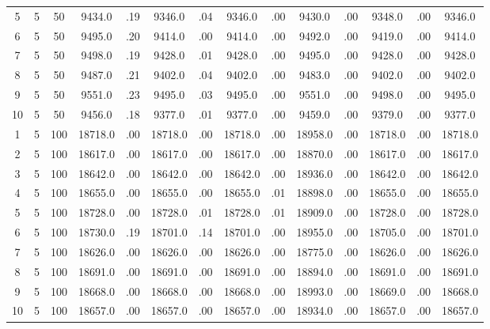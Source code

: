 \documentclass[12pt,a4paper]{article}
\begin{document}
\begin{center}
{\begin{tabular}{|ccc|cc|cc|cc|cc|cc|c|}
5             &   5&  50&   9434.0&  .19&   9346.0&  .04&   9346.0&  .00&   9430.0&  .00&   9348.0&  .00&   9346.0\\[-0.01in]
6             &   5&  50&   9495.0&  .20&   9414.0&  .00&   9414.0&  .00&   9492.0&  .00&   9419.0&  .00&   9414.0\\[-0.01in]
7             &   5&  50&   9498.0&  .19&   9428.0&  .01&   9428.0&  .00&   9495.0&  .00&   9428.0&  .00&   9428.0\\[-0.01in]
8             &   5&  50&   9487.0&  .21&   9402.0&  .04&   9402.0&  .00&   9483.0&  .00&   9402.0&  .00&   9402.0\\[-0.01in]
9             &   5&  50&   9551.0&  .23&   9495.0&  .03&   9495.0&  .00&   9551.0&  .00&   9498.0&  .00&   9495.0\\[-0.01in]
10            &   5&  50&   9456.0&  .18&   9377.0&  .01&   9377.0&  .00&   9459.0&  .00&   9379.0&  .00&   9377.0\\[-0.01in]
1             &   5& 100&  18718.0&  .00&  18718.0&  .00&  18718.0&  .00&  18958.0&  .00&  18718.0&  .00&  18718.0\\[-0.01in]
2             &   5& 100&  18617.0&  .00&  18617.0&  .00&  18617.0&  .00&  18870.0&  .00&  18617.0&  .00&  18617.0\\[-0.01in]
3             &   5& 100&  18642.0&  .00&  18642.0&  .00&  18642.0&  .00&  18936.0&  .00&  18642.0&  .00&  18642.0\\[-0.01in]
4             &   5& 100&  18655.0&  .00&  18655.0&  .00&  18655.0&  .01&  18898.0&  .00&  18655.0&  .00&  18655.0\\[-0.01in]
5             &   5& 100&  18728.0&  .00&  18728.0&  .01&  18728.0&  .01&  18909.0&  .00&  18728.0&  .00&  18728.0\\[-0.01in]
6             &   5& 100&  18730.0&  .19&  18701.0&  .14&  18701.0&  .00&  18955.0&  .00&  18705.0&  .00&  18701.0\\[-0.01in]
7             &   5& 100&  18626.0&  .00&  18626.0&  .00&  18626.0&  .00&  18775.0&  .00&  18626.0&  .00&  18626.0\\[-0.01in]
8             &   5& 100&  18691.0&  .00&  18691.0&  .00&  18691.0&  .00&  18894.0&  .00&  18691.0&  .00&  18691.0\\[-0.01in]
9             &   5& 100&  18668.0&  .00&  18668.0&  .00&  18668.0&  .00&  18993.0&  .00&  18669.0&  .00&  18668.0\\[-0.01in]
10            &   5& 100&  18657.0&  .00&  18657.0&  .00&  18657.0&  .00&  18934.0&  .00&  18657.0&  .00&  18657.0\\[-0.01in]

\end{tabular}}
\end{center}
\end{document}
